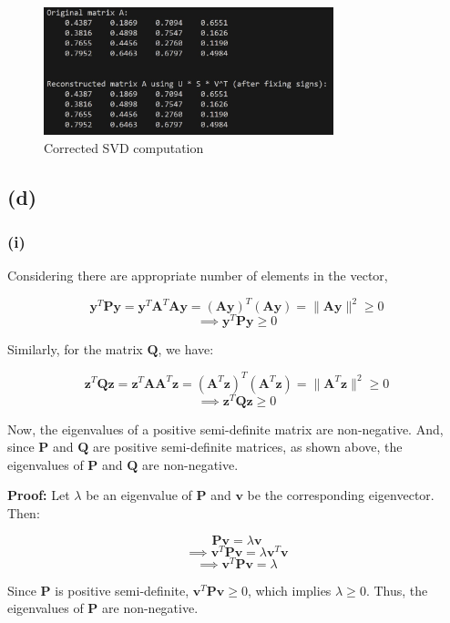 \documentclass{article}
\begin{document}
\begin{figure}[!htb]
    \centering
    \includegraphics[width=0.75\textwidth]{svd_corrected.jpg}
    \caption{Corrected SVD computation}
\end{figure}

\subsection*{(d)}

\subsubsection*{(i)}

Considering there are appropriate number of elements in the vector,

$$\mathbf{y}^T\mathbf{P}\mathbf{y} = \mathbf{y}^T\mathbf{A}^T\mathbf{A}\mathbf{y} = (\mathbf{A}\mathbf{y})^T(\mathbf{A}\mathbf{y}) = \|\mathbf{A}\mathbf{y}\|^2 \geq 0$$
$$\implies \mathbf{y}^T\mathbf{P}\mathbf{y} \geq 0$$

Similarly, for the matrix \( \mathbf{Q} \), we have:

$$\mathbf{z}^T\mathbf{Q}\mathbf{z} = \mathbf{z}^T\mathbf{A}\mathbf{A}^T\mathbf{z} = (\mathbf{A}^T\mathbf{z})^T(\mathbf{A}^T\mathbf{z}) = \|\mathbf{A}^T\mathbf{z}\|^2 \geq 0$$
$$\implies \mathbf{z}^T\mathbf{Q}\mathbf{z} \geq 0$$

Now, the eigenvalues of a positive semi-definite matrix are non-negative. 
And, since \( \mathbf{P} \) and \( \mathbf{Q} \) are positive semi-definite matrices, as shown above, the eigenvalues of \( \mathbf{P} \) and \( \mathbf{Q} \) are non-negative.

\textbf{Proof:} Let \( \lambda \) be an eigenvalue of \( \mathbf{P} \) and \( \mathbf{v} \) be the corresponding eigenvector. Then:

$$\mathbf{P}\mathbf{v} = \lambda \mathbf{v}$$
$$\implies \mathbf{v}^T\mathbf{P}\mathbf{v} = \lambda \mathbf{v}^T\mathbf{v}$$
$$\implies \mathbf{v}^T\mathbf{P}\mathbf{v} = \lambda$$

Since \( \mathbf{P} \) is positive semi-definite, \( \mathbf{v}^T\mathbf{P}\mathbf{v} \geq 0 \), which implies \( \lambda \geq 0 \). Thus, the eigenvalues of \( \mathbf{P} \) are non-negative.
\end{document}

